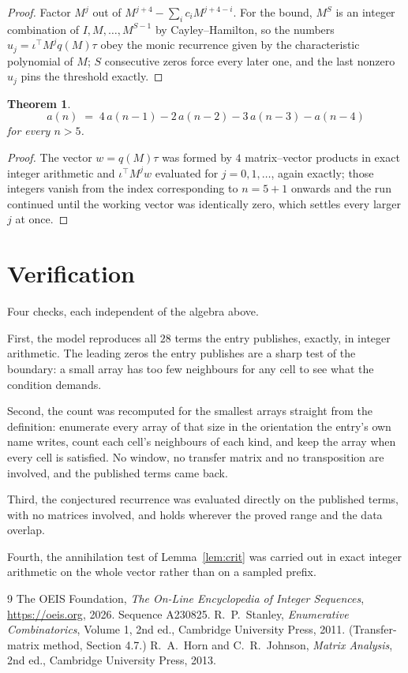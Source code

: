 \documentclass[11pt,a4paper]{article}
\theoremstyle{plain}
\newtheorem{theorem}{Theorem}
\theoremstyle{definition}
\begin{document}
\begin{proof}
Factor $M^{j}$ out of $M^{j+4}-\sum_ic_iM^{j+4-i}$. For the bound, $M^{S}$
is an integer combination of $I,M,\dots,M^{S-1}$ by Cayley--Hamilton, so the numbers
$u_j=\iota^{\!\top}M^{j}q(M)\tau$ obey the monic recurrence given by the characteristic
polynomial of $M$; $S$ consecutive zeros force every later one, and the last nonzero $u_j$
pins the threshold exactly.
\end{proof}

\begin{theorem}
\[
a(n)\;=\;4\,a(n-1) - 2\,a(n-2) - 3\,a(n-3) - a(n-4)
\]
for every $n>5$.
\end{theorem}

\begin{proof}
The vector $w=q(M)\tau$ was formed by $4$ matrix--vector products in exact integer
arithmetic and $\iota^{\!\top}M^{j}w$ evaluated for $j=0,1,\dots$, again exactly; those
integers vanish from the index corresponding to $n=5+1$ onwards and the run continued
until the working vector was identically zero, which settles every larger $j$ at once.
\end{proof}

\section{Verification}

Four checks, each independent of the algebra above.

First, the model reproduces all $28$ terms the entry publishes, exactly, in integer
arithmetic. The leading zeros the entry publishes are a sharp test of the boundary: a small
array has too few neighbours for any cell to see what the condition demands.

Second, the count was recomputed for the smallest arrays straight from the definition:
enumerate every array of that size in the orientation the entry's own name writes, count each
cell's neighbours of each kind, and keep the array when every cell is satisfied. No window, no
transfer matrix and no transposition are involved, and the published terms came back.

Third, the conjectured recurrence was evaluated directly on the published terms, with no
matrices involved, and holds wherever the proved range and the data overlap.

Fourth, the annihilation test of Lemma~\ref{lem:crit} was carried out in exact integer
arithmetic on the whole vector rather than on a sampled prefix.

\begin{thebibliography}{9}
 The OEIS Foundation, \emph{The On-Line Encyclopedia of Integer
Sequences}, \url{https://oeis.org}, 2026. Sequence A230825.
 R.~P.~Stanley, \emph{Enumerative Combinatorics}, Volume 1, 2nd ed.,
Cambridge University Press, 2011. (Transfer-matrix method, Section 4.7.)
 R.~A.~Horn and C.~R.~Johnson, \emph{Matrix Analysis}, 2nd ed., Cambridge
University Press, 2013.
\end{thebibliography}
\end{document}
